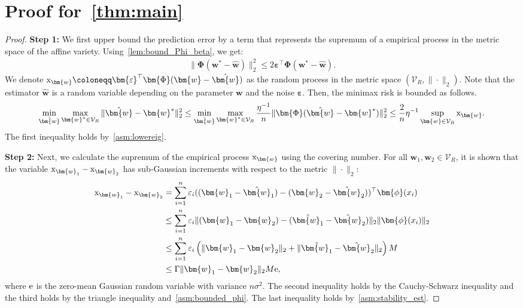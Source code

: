 \documentclass{article}
\def\re{{\textnormal{e}}}
\def\rx{{\textnormal{x}}}
\theoremstyle{plain}
\theoremstyle{definition}
\theoremstyle{remark}
\begin{document}

\section{Proof for~\cref{thm:main}}
\label{app:proof_thm:main}
\main*
\begin{proof}[Proof]
\textbf{Step 1:} We first upper bound the prediction error by a term that represents the supremum of a empirical process in the metric space of the affine variety.
Using~\cref{lem:bound_Phi_beta}, we get:
\begin{align*}
\|\bm{\Phi}(\bm{w}^* - \hat{\bm{w}})\|_2^2 \leq 2 \bm{\varepsilon}^{\top} \bm{\Phi}(\bm{w}^* - \hat{\bm{w}}).
\end{align*}
We denote \(\rx_{\bm{w}} \coloneqq \bm{\varepsilon}^{\top} \bm{\Phi}(\bm{w}-\hat{\bm{w}})\) as the random process in the metric space \((\mathcal{V}_R , \|\cdot\|_2)\). Note that the estimator \(\hat{\bm{w}}\) is a random variable depending on the parameter \(\bm{w}\) and the noise \(\bm{\varepsilon}\). Then, the minimax risk is bounded as follows.
\begin{align}
    \label{eq:bound_minimax_risk}
    \min_{\hat{\bm{w}}} \max_{\bm{w}^* \in \mathcal{V}_R} \|\hat{\bm{w}} - \bm{w}^*\|_2^2 \leq \min_{\hat{\bm{w}}} \max_{\bm{w}^* \in \mathcal{V}_R} \frac{\eta^{-1}}{n} \|\bm{\Phi} (\hat{\bm{w}} - \bm{w}^*)\|_2^2 \leq \frac{2}{n} \eta^{-1} \sup_{\bm{w} \in \mathcal{V}_R} \rx_{\bm{w}}.
\end{align}
The first inequality holds by~\cref{asm:lowereig}. 

\textbf{Step 2:} Next, we calculate the supremum of the empirical process \(\rx_{\bm{w}}\) using the covering number. 
For all \(\bm{w}_1, \bm{w}_2 \in \mathcal{V}_R\), it is shown that the variable \(\rx_{\bm{w}_1} - \rx_{\bm{w}_2}\) has sub-Gaussian increments with respect to the metric \(\|\cdot\|_2\):
\begin{align}
    \label{eq:Gaussian_increments}
    \begin{aligned}
    \rx_{\bm{w}_1}- \rx_{\bm{w}_2} &= \sum_{i=1}^n \varepsilon_i ((\bm{w}_1-\hat{\bm{w}}_1)-(\bm{w}_2-\hat{\bm{w}}_2))^{\top}\bm{\phi}(x_i) \\
    &\leq \sum_{i=1}^n \varepsilon_i \|(\bm{w}_1-\bm{w}_2)-(\hat{\bm{w}_1}-\hat{\bm{w}}_2)\|_2\|\bm{\phi}(x_i)\|_2 \\
    &\leq \sum_{i=1}^n \varepsilon_i \left(\|\bm{w}_1-\bm{w}_2\|_2 +\|\hat{\bm{w}_1}-\hat{\bm{w}}_2\|_2\right) M \\
    &\leq \Gamma \|\bm{w}_1-\bm{w}_2\|_2 M \re,
    \end{aligned}
\end{align}
where \(\re\) is the zero-mean Gaussian random variable with variance \(n\sigma^2\). The second inequality holds by the Cauchy-Schwarz inequality and the third holds by the triangle inequality and~\cref{asm:bounded_phi}. The last inequality holds by~\cref{asm:stability_est}.


\end{proof}
\end{document}
